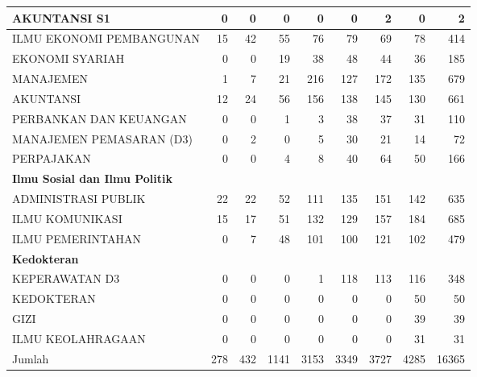 \documentclass[
]{book}
\begin{document}
\begin{table}[H]
{\begin{tabular}{l|r|r|r|r|r|r|r|r}
\hline
\hspace{1em}AKUNTANSI S1 & 0 & 0 & 0 & 0 & 0 & 2 & 0 & 2\\
\hline
\hspace{1em}ILMU EKONOMI PEMBANGUNAN & 15 & 42 & 55 & 76 & 79 & 69 & 78 & 414\\
\hline
\hspace{1em}EKONOMI SYARIAH & 0 & 0 & 19 & 38 & 48 & 44 & 36 & 185\\
\hline
\hspace{1em}MANAJEMEN & 1 & 7 & 21 & 216 & 127 & 172 & 135 & 679\\
\hline
\hspace{1em}AKUNTANSI & 12 & 24 & 56 & 156 & 138 & 145 & 130 & 661\\
\hline
\hspace{1em}PERBANKAN DAN KEUANGAN & 0 & 0 & 1 & 3 & 38 & 37 & 31 & 110\\
\hline
\hspace{1em}MANAJEMEN PEMASARAN (D3) & 0 & 2 & 0 & 5 & 30 & 21 & 14 & 72\\
\hline
\hspace{1em}PERPAJAKAN & 0 & 0 & 4 & 8 & 40 & 64 & 50 & 166\\
\hline
\multicolumn{9}{l}{\textbf{Ilmu Sosial dan Ilmu Politik}}\\
\hline
\hspace{1em}ADMINISTRASI PUBLIK & 22 & 22 & 52 & 111 & 135 & 151 & 142 & 635\\
\hline
\hspace{1em}ILMU KOMUNIKASI & 15 & 17 & 51 & 132 & 129 & 157 & 184 & 685\\
\hline
\hspace{1em}ILMU PEMERINTAHAN & 0 & 7 & 48 & 101 & 100 & 121 & 102 & 479\\
\hline
\multicolumn{9}{l}{\textbf{Kedokteran}}\\
\hline
\hspace{1em}KEPERAWATAN D3 & 0 & 0 & 0 & 1 & 118 & 113 & 116 & 348\\
\hline
\hspace{1em}KEDOKTERAN & 0 & 0 & 0 & 0 & 0 & 0 & 50 & 50\\
\hline
\hspace{1em}GIZI & 0 & 0 & 0 & 0 & 0 & 0 & 39 & 39\\
\hline
\hspace{1em}ILMU KEOLAHRAGAAN & 0 & 0 & 0 & 0 & 0 & 0 & 31 & 31\\
\hline
Jumlah & 278 & 432 & 1141 & 3153 & 3349 & 3727 & 4285 & 16365\\
\hline
\end{tabular}}
\end{table}
\end{document}
